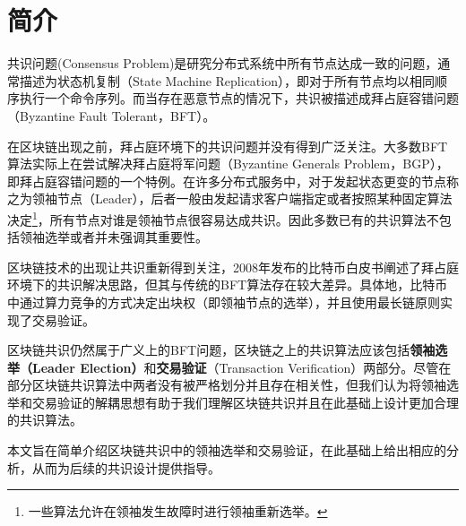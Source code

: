 \section{简介}
共识问题(Consensus Problem)是研究分布式系统中所有节点达成一致的问题，通常描述为状态机复制（State Machine Replication），即对于所有节点均以相同顺序执行一个命令序列。而当存在恶意节点的情况下，共识被描述成拜占庭容错问题（Byzantine Fault Tolerant，BFT）\cite{pease1980reaching}。

在区块链出现之前，拜占庭环境下的共识问题并没有得到广泛关注。大多数BFT算法实际上在尝试解决拜占庭将军问题（Byzantine Generals Problem，BGP）\cite{lamport1982byzantine}，即拜占庭容错问题的一个特例。在许多分布式服务中，对于发起状态更变的节点称之为领袖节点（Leader），后者一般由发起请求客户端指定或者按照某种固定算法决定\footnote{一些算法允许在领袖发生故障时进行领袖重新选举。}，所有节点对谁是领袖节点很容易达成共识。因此多数已有的共识算法不包括领袖选举或者并未强调其重要性。


区块链技术的出现让共识重新得到关注，2008年发布的比特币白皮书\cite{nakamoto2008bitcoin}阐述了拜占庭环境下的共识解决思路，但其与传统的BFT算法存在较大差异。具体地，比特币中通过算力竞争的方式决定出块权（即领袖节点的选举），并且使用最长链原则实现了交易验证。

区块链共识仍然属于广义上的BFT问题，区块链之上的共识算法应该包括\textbf{领袖选举（Leader Election）}和\textbf{交易验证}（Transaction Verification）两部分\cite{eyal2016bitcoin,kogias2016enhancing}。尽管在部分区块链共识算法中两者没有被严格划分并且存在相关性\cite{gilad2017algorand}，但我们认为将领袖选举和交易验证的解耦思想有助于我们理解区块链共识并且在此基础上设计更加合理的共识算法。

本文旨在简单介绍区块链共识中的领袖选举和交易验证，在此基础上给出相应的分析，从而为后续的共识设计提供指导。


